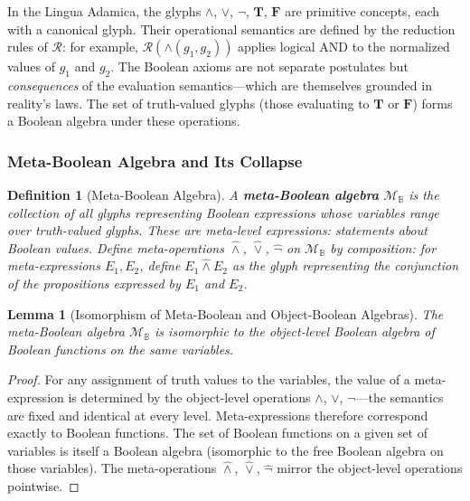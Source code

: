 \documentclass[12pt, letterpaper]{book}
\def\mathfrak#1{#1}%
\newtheorem{lemma}[theorem]{Lemma}
\newtheorem{definition}{Definition}[chapter]
\begin{document}
In the Lingua Adamica, the glyphs $\land$, $\lor$, $\neg$, $\mathbf{T}$, $\mathbf{F}$ are primitive concepts, each with a canonical glyph. Their operational semantics are defined by the reduction rules of $\mathcal{R}$: for example, $\mathcal{R}(\land(\mathfrak{g}_1, \mathfrak{g}_2))$ applies logical AND to the normalized values of $\mathfrak{g}_1$ and $\mathfrak{g}_2$. The Boolean axioms are not separate postulates but \textit{consequences} of the evaluation semantics---which are themselves grounded in reality's laws. The set of truth-valued glyphs (those evaluating to $\mathbf{T}$ or $\mathbf{F}$) forms a Boolean algebra under these operations.

\subsubsection{Meta-Boolean Algebra and Its Collapse}

\begin{definition}[Meta-Boolean Algebra]\label{def:meta-boolean}
A \textbf{meta-Boolean algebra} $\mathcal{M}_{\mathbb{B}}$ is the collection of all glyphs representing Boolean expressions whose variables range over truth-valued glyphs. These are meta-level expressions: statements \textit{about} Boolean values. Define meta-operations $\hat{\land}$, $\hat{\lor}$, $\hat{\neg}$ on $\mathcal{M}_{\mathbb{B}}$ by composition: for meta-expressions $E_1, E_2$, define $E_1 \hat{\land} E_2$ as the glyph representing the conjunction of the propositions expressed by $E_1$ and $E_2$.
\end{definition}

\begin{lemma}[Isomorphism of Meta-Boolean and Object-Boolean Algebras]\label{lem:meta-bool-iso}
The meta-Boolean algebra $\mathcal{M}_{\mathbb{B}}$ is isomorphic to the object-level Boolean algebra of Boolean functions on the same variables.
\end{lemma}

\begin{proof}
For any assignment of truth values to the variables, the value of a meta-expression is determined by the object-level operations $\land$, $\lor$, $\neg$---the semantics are fixed and identical at every level. Meta-expressions therefore correspond exactly to Boolean functions. The set of Boolean functions on a given set of variables is itself a Boolean algebra (isomorphic to the free Boolean algebra on those variables). The meta-operations $\hat{\land}$, $\hat{\lor}$, $\hat{\neg}$ mirror the object-level operations pointwise.
\end{proof}
\end{document}
